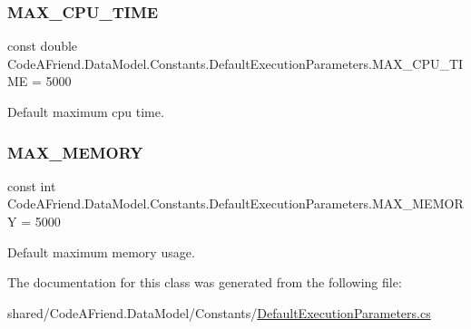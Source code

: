 \subsubsection{\texorpdfstring{M\+A\+X\+\_\+\+C\+P\+U\+\_\+\+T\+I\+ME}{MAX\_CPU\_TIME}}
{\footnotesize\ttfamily const double Code\+A\+Friend.\+Data\+Model.\+Constants.\+Default\+Execution\+Parameters.\+M\+A\+X\+\_\+\+C\+P\+U\+\_\+\+T\+I\+ME = 5000}



Default maximum cpu time. 

\mbox{\label{class_code_a_friend_1_1_data_model_1_1_constants_1_1_default_execution_parameters_ae95dd594b14e585446672f9724b44d73}} 
\subsubsection{\texorpdfstring{M\+A\+X\+\_\+\+M\+E\+M\+O\+RY}{MAX\_MEMORY}}
{\footnotesize\ttfamily const int Code\+A\+Friend.\+Data\+Model.\+Constants.\+Default\+Execution\+Parameters.\+M\+A\+X\+\_\+\+M\+E\+M\+O\+RY = 5000}



Default maximum memory usage. 



The documentation for this class was generated from the following file\+:\begin{DoxyCompactItemize}
\item 
shared/\+Code\+A\+Friend.\+Data\+Model/\+Constants/\mbox{\hyperlink{_default_execution_parameters_8cs}{Default\+Execution\+Parameters.\+cs}}\end{DoxyCompactItemize}
